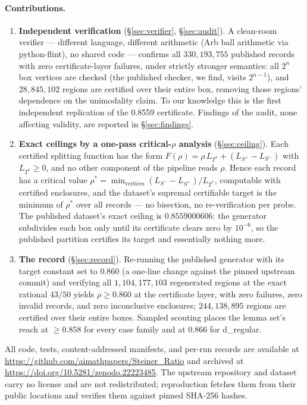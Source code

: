 \documentclass[11pt]{article}
\newcommand{\rr}{\rho}
\newcommand{\ts}{L_{T^*}}
\newcommand{\snet}{L_{S^+}\!-\!L_{S^-}}
\begin{document}
\paragraph{Contributions.}
\begin{enumerate}
  \item \textbf{Independent verification} (\S\ref{sec:verifier},
  \S\ref{sec:audit}). A clean-room verifier --- different language,
  different arithmetic (Arb ball arithmetic \cite{Arb17} via
  python-flint), no shared code --- confirms all $330{,}193{,}755$
  published records with zero certificate-layer failures, under
  strictly stronger semantics: all $2^n$ box vertices are checked
  (the published checker, we find, visits $2^{n-1}$), and
  $28{,}845{,}102$ regions are certified over their entire box,
  removing those regions' dependence on the unimodality claim. To our
  knowledge this is the first independent replication of the 0.8559
  certificate. Findings of the audit, none affecting validity, are
  reported in \S\ref{sec:findings}.
  \item \textbf{Exact ceilings by a one-pass critical-$\rr$ analysis}
  (\S\ref{sec:ceiling}). Each certified splitting function has the form
  $F(\rr) = \rr\,\ts + (\snet)$ with $\ts \ge 0$, and no other component
  of the pipeline reads $\rr$. Hence each record has a critical value
  $\rr^\ast = \min_{\text{vertices}} (L_{S^-}\!-\!L_{S^+})/\ts$,
  computable with certified enclosures, and the dataset's supremal
  certifiable target is the minimum of $\rr^\ast$ over all records ---
  no bisection, no re-verification per probe. The published dataset's
  exact ceiling is $\mathbf{0.8559000606}$: the generator subdivides
  each box only until its certificate clears zero by $10^{-6}$, so the
  published partition certifies its target and essentially nothing more.
  \item \textbf{The record} (\S\ref{sec:record}). Re-running the
  published generator with its target constant set to $0.860$ (a
  one-line change against the pinned upstream commit) and verifying all
  $1{,}104{,}177{,}103$ regenerated regions at the exact rational
  $43/50$ yields $\rr \ge 0.860$ at the certificate layer, with zero
  failures, zero invalid records, and zero inconclusive enclosures;
  $244{,}138{,}895$ regions are certified over their entire boxes.
  Sampled scouting places the lemma set's reach at $\ge 0.858$ for
  every case family and at $0.866$ for d\_regular.
\end{enumerate}

All code, tests, content-addressed manifests, and per-run records are
available at \url{https://github.com/aimathpapers/Steiner_Ratio} and
archived at \url{https://doi.org/10.5281/zenodo.22223485}. The
upstream repository and dataset carry no license and are not
redistributed; reproduction fetches them from their public locations and
verifies them against pinned SHA-256 hashes.
\end{document}
